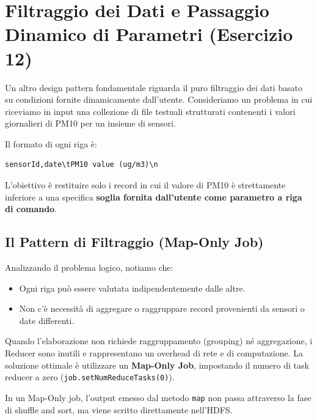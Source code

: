 \section{Filtraggio dei Dati e Passaggio Dinamico di Parametri (Esercizio 12)}

Un altro design pattern fondamentale riguarda il puro filtraggio dei dati basato su condizioni fornite dinamicamente dall'utente. 
Consideriamo un problema in cui riceviamo in input una collezione di file testuali strutturati contenenti i valori giornalieri di PM10 per un insieme di sensori. 

Il formato di ogni riga è:
\begin{verbatim}
sensorId,date\tPM10 value (ug/m3)\n
\end{verbatim}

L'obiettivo è restituire solo i record in cui il valore di PM10 è strettamente inferiore a una specifica \textbf{soglia fornita dall'utente come parametro a riga di comando}.

\subsection{Il Pattern di Filtraggio (Map-Only Job)}
Analizzando il problema logico, notiamo che:
\begin{itemize}
    \item Ogni riga può essere valutata indipendentemente dalle altre.
    \item Non c'è necessità di aggregare o raggruppare record provenienti da sensori o date differenti.
\end{itemize}

Quando l'elaborazione non richiede raggruppamento (grouping) né aggregazione, i Reducer sono inutili e rappresentano un overhead di rete e di computazione. La soluzione ottimale è utilizzare un \textbf{Map-Only Job}, impostando il numero di task reducer a zero (\texttt{job.setNumReduceTasks(0)}). 

In un Map-Only job, l'output emesso dal metodo \texttt{map} non passa attraverso la fase di shuffle and sort, ma viene scritto direttamente nell'HDFS.

